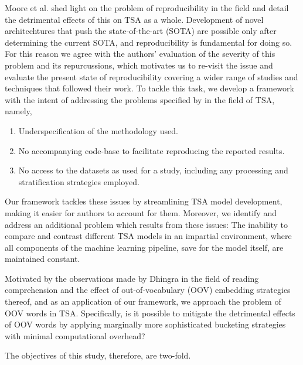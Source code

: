 \documentclass[../../fyp.tex]{subfiles}
\begin{document}
Moore et al. \cite{moore2018} shed light on the problem of reproducibility in the field and detail the detrimental effects of this on TSA as a whole. Development of novel architechtures that push the state-of-the-art (SOTA) are possible only after determining the current SOTA, and reproducibility is fundamental for doing so. For this reason we agree with the authors' evaluation of the severity of this problem and its repurcussions, which motivates us to re-visit the issue and evaluate the present state of reproducibility covering a wider range of studies and techniques that followed their work. To tackle this task, we develop a framework with the intent of addressing the problems specified by \cite{moore2018} in the field of TSA, namely,

\begin{enumerate}
	\item Underspecification of the methodology used.
	\item No accompanying code-base to facilitate reproducing the reported results.
	\item No access to the datasets as used for a study, including any processing and stratification strategies employed.
\end{enumerate}

Our framework tackles these issues by streamlining TSA model development, making it easier for authors to account for them. Moreover, we identify and address an additional problem which results from these issues: The inability to compare and contrast different TSA models in an impartial environment, where all components of the machine learning pipeline, save for the model itself, are maintained constant.

Motivated by the observations made by Dhingra \cite{bhuwandhingra2017} in the field of reading comprehension and the effect of out-of-vocabulary (OOV) embedding strategies thereof, and as an application of our framework, we approach the problem of OOV words in TSA. Specifically, is it possible to mitigate the detrimental effects of OOV words by applying marginally more sophisticated bucketing strategies with minimal computational overhead?

The objectives of this study, therefore, are two-fold.
\end{document}
